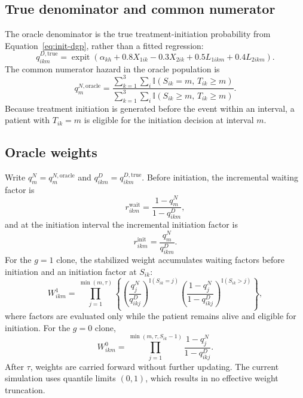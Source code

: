 \documentclass[11pt]{article}
\newcommand{\expit}{\operatorname{expit}}
\newcommand{\ind}{\mathbb{I}}
\begin{document}
\subsection{True denominator and common numerator}

The oracle denominator is the true treatment-initiation probability from
Equation~\eqref{eq:init-dgp}, rather than a fitted regression:
\[
  q_{ikm}^{D,\mathrm{true}}
  =\expit\!\left(
      \alpha_{kh}+0.8X_{1ik}-0.3X_{2ik}
      +0.5L_{1ikm}+0.4L_{2ikm}
    \right).
\]
The common numerator hazard in the oracle population is
\begin{equation}
\label{eq:oracle-num}
  q_m^{N,\mathrm{oracle}}
  =
  \frac{
    \sum_{k=1}^3\sum_i
      \ind(S_{ik}=m,\,T_{ik}\geq m)
  }{
    \sum_{k=1}^3\sum_i
      \ind(S_{ik}\geq m,\,T_{ik}\geq m)
  }.
\end{equation}
Because treatment initiation is generated before the event within an
interval, a patient with $T_{ik}=m$ is eligible for the initiation decision
at interval $m$.

\subsection{Oracle weights}

Write $q_m^N=q_m^{N,\mathrm{oracle}}$ and
$q_{ikm}^D=q_{ikm}^{D,\mathrm{true}}$. Before initiation, the incremental
waiting factor is
\[
  r^{\mathrm{wait}}_{ikm}
  =\frac{1-q_m^N}{1-q_{ikm}^D},
\]
and at the initiation interval the incremental initiation factor is
\[
  r^{\mathrm{init}}_{ikm}
  =\frac{q_m^N}{q_{ikm}^D}.
\]
For the $g=1$ clone, the stabilized weight accumulates waiting factors before
initiation and an initiation factor at $S_{ik}$:
\begin{equation}
\label{eq:w1}
  W^1_{ikm}
  =\prod_{j=1}^{\min(m,\tau)}
    \left\{
      \left(\frac{q_j^N}{q_{ikj}^D}\right)^{\ind(S_{ik}=j)}
      \left(\frac{1-q_j^N}{1-q_{ikj}^D}\right)^{\ind(S_{ik}>j)}
    \right\},
\end{equation}
where factors are evaluated only while the patient remains alive and
eligible for initiation. For the $g=0$ clone,
\begin{equation}
\label{eq:w0}
  W^0_{ikm}
  =\prod_{j=1}^{\min(m,\tau,S_{ik}-1)}
    \frac{1-q_j^N}{1-q_{ikj}^D}.
\end{equation}
After $\tau$, weights are carried forward without further updating. The
current simulation uses quantile limits $(0,1)$, which results in no effective
weight truncation.
\end{document}
